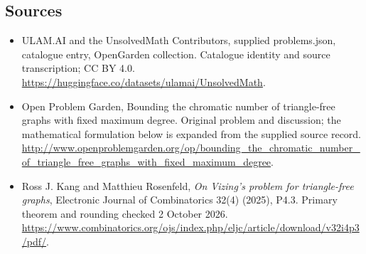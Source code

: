 \documentclass[11pt,a4paper]{article}
\begin{document}
\subsection{Sources}
\begin{itemize}
\item[S1] ULAM.AI and the UnsolvedMath Contributors, supplied problems.json, catalogue entry, OpenGarden collection. Catalogue identity and source transcription; CC BY 4.0.
\url{https://huggingface.co/datasets/ulamai/UnsolvedMath}.
\item[S2] Open Problem Garden, Bounding the chromatic number of triangle-free graphs with fixed maximum degree. Original problem and discussion; the mathematical formulation below is expanded from the supplied source record.
\url{http://www.openproblemgarden.org/op/bounding_the_chromatic_number_of_triangle_free_graphs_with_fixed_maximum_degree}.

\item[R1] Ross J. Kang and Matthieu Rosenfeld, \emph{On Vizing's
problem for triangle-free graphs}, Electronic Journal of Combinatorics
32(4) (2025), P4.3. Primary theorem and rounding checked 2 October 2026.
\url{https://www.combinatorics.org/ojs/index.php/eljc/article/download/v32i4p3/pdf/}.

\end{itemize}
\end{document}

